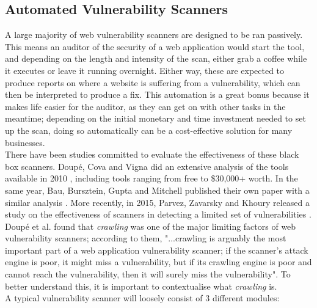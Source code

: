 \subsection{Automated Vulnerability Scanners}
 
A large majority of web vulnerability scanners are designed to be ran passively. This means an auditor of the security of a web application would start the tool, and depending on the length and intensity of the scan, either grab a coffee while it executes or leave it running overnight. Either way, these are expected to produce reports on where a website is suffering from a vulnerability, which can then be interpreted to produce a fix. This automation is a great bonus because it makes life easier for the auditor, as they can get on with other tasks in the meantime; depending on the initial monetary and time investment needed to set up the scan, doing so automatically can be a cost-effective solution for many businesses. \\

There have been studies committed to evaluate the effectiveness of these black box scanners. Doup\'e, Cova and Vigna did an extensive analysis of the tools available in 2010 \cite{whyJohnnyCantPentest}, including tools ranging from free to \$30,000+ worth. In the same year, Bau, Bursztein, Gupta and Mitchell published their own paper with a similar analysis \cite{stateOfArtAutomatedBlackBoxWebAppVulnTesting}. More recently, in 2015, Parvez, Zavarsky and Khoury released a study on the effectiveness of scanners in detecting a limited set of vulnerabilities \cite{analysisOfEffectivenessOfBlackBoxWebAppScannersStoredSQLStoredXSS}. \\

Doup\'e et al. found that \textit{crawling} was one of the major limiting factors of web vulnerability scanners; according to them, {"...crawling is arguably the most important part of a web application vulnerability scanner; if the scanner’s attack engine is poor, it might miss a vulnerability, but if its crawling engine is poor and cannot reach the vulnerability, then it will surely miss the vulnerability"}. To better understand this, it is important to contextualise what \textit{crawling} is. \\

A typical vulnerability scanner will loosely consist of 3 different modules:

